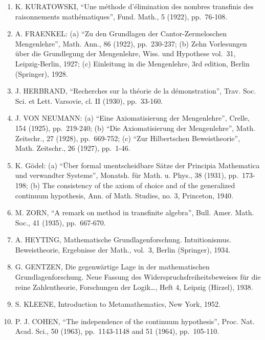 \begin{enumerate}
\item
  K. KURATOWSKI, ``Une méthode d'élimination des nombres transfinis des raisonnements mathématiques'', Fund. Math., 5 (1922), pp.~76-108.
\item
  A. FRAENKEL: (a) ``Zu den Grundlagen der Cantor-Zermeloschen Mengenlehre'', Math. Ann., 86 (1922), pp.~230-237; (b) Zehn Vorlesungen über die Grundlegung der Mengenlehre, Wiss. und Hypothese vol.~31, Leipzig-Berlin, 1927; (c) Einleitung in die Mengenlehre, 3rd edition, Berlin (Springer), 1928.
\item
  J. HERBRAND, ``Recherches sur la théorie de la démonstration'', Trav. Soc. Sci. et Lett. Varsovie, cl. II (1930), pp.~33-160.
\item
  J. VON NEUMANN: (a) ``Eine Axiomatisierung der Mengenlehre'', Crelle, 154 (1925), pp.~219-240; (b) ``Die Axiomatisierung der Mengenlehre'', Math. Zeitschr., 27 (1928), pp.~669-752; (c) ``Zur Hilbertschen Beweistheorie'', Math. Zeitschr., 26 (1927), pp.~1-46.
\item
  K. Gödel: (a) ``Über formal unentscheidbare Sätze der Principia Mathematica und verwandter Systeme'', Monatsh. für Math. u. Phys., 38 (1931), pp.~173-198; (b) The consistency of the axiom of choice and of the generalized continuum hypothesis, Ann. of Math. Studies, no. 3, Princeton, 1940.
\item
  M. ZORN, ``A remark on method in transfinite algebra'', Bull. Amer. Math. Soc., 41 (1935), pp.~667-670.
\item
  A. HEYTING, Mathematische Grundlagenforschung. Intuitionismus. Beweistheorie, Ergebnisse der Math., vol.~3, Berlin (Springer), 1934.
\item
  G. GENTZEN, Die gegenwärtige Lage in der mathematischen Grundlagenforschung. Neue Fassung des Widerspruchsfreiheitsbeweises für die reine Zahlentheorie, Forschungen der Logik\ldots, Heft 4, Leipzig (Hirzel), 1938.
\item
  S. KLEENE, Introduction to Metamathematics, New York, 1952.
\item
  P. J. COHEN, ``The independence of the continuum hypothesis'', Proc. Nat. Acad. Sci., 50 (1963), pp.~1143-1148 and 51 (1964), pp.~105-110.
\end{enumerate}
